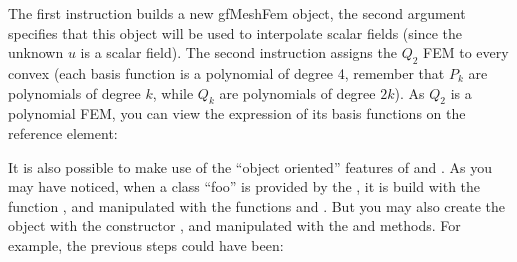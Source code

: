 \documentclass[a4paper,11pt,english]{sphinxmanual}
\begin{document}
The first instruction builds a new gfMeshFem object, the second argument specifies
that this object will be used to interpolate scalar fields (since the unknown
\(u\) is a scalar field). The second instruction assigns the \(Q_2\) FEM
to every convex (each basis function is a polynomial of degree 4, remember that
\(P_k\) are polynomials of degree \(k\), while
\(Q_k\) are polynomials of degree \(2k\)). As \(Q_2\) is a
polynomial FEM, you can view the expression of its basis functions on the
reference element:

\begin{sphinxVerbatim}[commandchars=\\\{\}]
  
 
\end{sphinxVerbatim}

It is also possible to make use of the “object oriented” features of  and . As
you may have noticed, when a class “foo” is provided by the , it is build
with the function , and manipulated with the functions 
and . But you may also create the
object with the  constructor , and manipulated with the  and
 methods. For example, the previous steps could have been:
\end{document}
